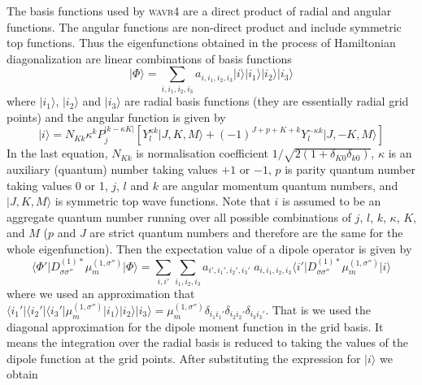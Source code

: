 The basis functions used by \textsc{wavr4} \citep{Tennyson}
are a direct product of radial and angular functions. 
The angular functions are non-direct product and include symmetric top functions.
Thus the eigenfunctions obtained in the process of Hamiltonian diagonalization
are linear combinations of basis functions 
\begin{equation}
\vert \Phi \rangle = \sum_{i, i_1, i_2, i_3} a_{i, i_1, i_2, i_3} 
\vert i \rangle \vert i_1 \rangle \vert i_2 \rangle \vert i_3 \rangle
\end{equation}
where $\vert i_1 \rangle$, $\vert i_2 \rangle$ and $\vert i_3 \rangle$ are radial basis functions
(they are essentially radial grid points) and the angular function is given by
\begin{equation}
\vert i \rangle = N_{Kk} \kappa^k P^{\vert k-\kappa K \vert}_j
\left[ Y^{\kappa k}_l \vert J, K, M\rangle + (-1)^{J+p+K+k} Y^{-\kappa k}_l \vert J, -K, M \rangle \right]
\end{equation}
In the last equation, $N_{Kk}$ is normalisation coefficient $1/\sqrt{2 (1+ \delta_{K0} \delta_{k0})}$,
$\kappa$ is an auxiliary (quantum) number taking values $+1$ or $-1$,
$p$ is parity quantum number taking values 0 or 1,
$j$, $l$ and $k$ are angular momentum quantum numbers, and
$\vert J, K, M\rangle$ is symmetric top wave functions.
Note that $i$ is assumed to be an aggregate quantum number running over all possible combinations
of $j$, $l$, $k$, $\kappa$, $K$, and $M$ ($p$ and $J$ are strict quantum numbers and therefore 
are the same for the whole eigenfunction).
Then the expectation value of a dipole operator is given by
\begin{equation}
\langle \Phi' \vert D^{(1)*}_{\sigma \sigma''}
\mu^{(1,\sigma'')}_m \vert \Phi \rangle
= \sum_{i, i'} \sum_{i_1, i_2, i_3} 
a_{i', i_1', i_2', i_3'} \; a_{i, i_1, i_2, i_3} 
\langle i' \vert D^{(1)*}_{\sigma \sigma''} \mu^{(1,\sigma'')}_m \vert i \rangle
\end{equation}
where we used an approximation that
$\langle i_1' \vert \langle i_2' \vert \langle i_3' \vert
\mu^{(1,\sigma'')}_m
\vert i_1 \rangle \vert i_2 \rangle \vert i_3 \rangle = 
\mu^{(1,\sigma'')}_m \delta_{i_1 i_1'} \delta_{i_2 i_2'} \delta_{i_3 i_3'}$.
That is we used the diagonal approximation for the dipole moment function in the grid basis.
It means the integration over the radial basis is reduced to taking the values of the dipole function
at the grid points. 
After substituting the expression for $\vert i \rangle$ we obtain
